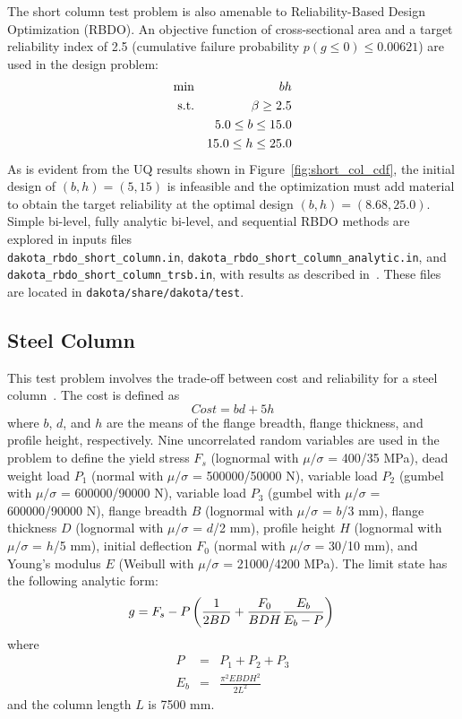 The short column test problem is also amenable to Reliability-Based Design Optimization (RBDO). An
objective function of cross-sectional area and a target reliability
index of 2.5 (cumulative failure probability $p(g \le 0) \le 0.00621$)
are used in the design problem:
\begin{eqnarray}
\min       & & bh \nonumber \\
{\rm s.t.} & & \beta \geq 2.5 \nonumber \\
           & &  5.0 \leq b \leq 15.0 \nonumber \\
           & & 15.0 \leq h \leq 25.0
\end{eqnarray}
As is evident from the UQ results shown in
Figure~\ref{fig:short_col_cdf}, the initial design of $(b, h) = (5,
15)$ is infeasible and the optimization must add material to obtain
the target reliability at the optimal design $(b, h) = (8.68, 25.0)$.
Simple bi-level, fully analytic bi-level, and sequential RBDO methods
are explored in inputs files \\
\texttt{dakota\_rbdo\_short\_column.in},
\texttt{dakota\_rbdo\_short\_column\_analytic.in}, and\\
\texttt{dakota\_rbdo\_short\_column\_trsb.in}, with results as
described in~\cite{Eld05,Eld06a}. These files are located in {\tt dakota/share/dakota/test}.

\subsection{Steel Column}\label{additional:steel_column}

This test problem involves the trade-off between cost and
reliability for a steel column~\cite{Kus97}. The cost is defined as
\begin{equation}
Cost = b d + 5 h
\end{equation}
where $b$, $d$, and $h$ are the means of the flange breadth, flange
thickness, and profile height, respectively. Nine uncorrelated random
variables are used in the problem to define the yield stress $F_s$
(lognormal with $\mu/\sigma$ = 400/35 MPa), dead weight load $P_1$
(normal with $\mu/\sigma$ = 500000/50000 N), variable load $P_2$
(gumbel with $\mu/\sigma$ = 600000/90000 N), variable load $P_3$
(gumbel with $\mu/\sigma$ = 600000/90000 N), flange breadth $B$
(lognormal with $\mu/\sigma$ = $b$/3 mm), flange thickness $D$
(lognormal with $\mu/\sigma$ = $d$/2 mm), profile height $H$
(lognormal with $\mu/\sigma$ = $h$/5 mm), initial deflection $F_0$
(normal with $\mu/\sigma$ = 30/10 mm), and Young's modulus $E$ (Weibull
with $\mu/\sigma$ = 21000/4200 MPa). The limit state has the
following analytic form:
\begin{equation}
g = F_s - P \left( \frac{1}{2 B D} +
\frac{F_0}{B D H} \frac{E_b}{E_b - P} \right)\\
\end{equation}
where
\begin{eqnarray}
P   & = & P_1 + P_2 + P_3 \\
E_b & = & \frac{\pi^2 E B D H^2}{2 L^2}
\end{eqnarray}
and the column length $L$ is 7500 mm.

